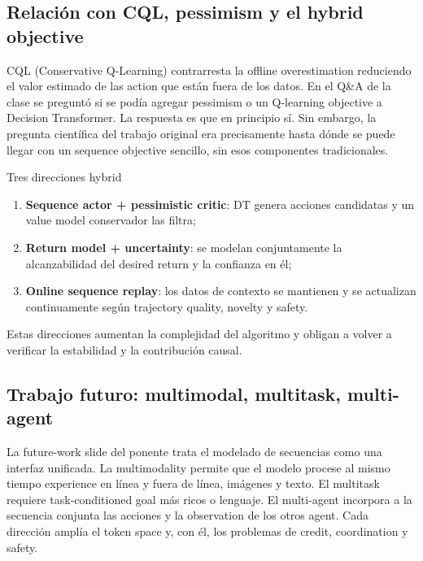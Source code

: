 \subsection{Relación con CQL, pessimism y el hybrid objective}

CQL (Conservative Q-Learning) contrarresta la offline overestimation reduciendo el valor estimado de las action que están fuera de los datos. En el Q\&A de la clase se preguntó si se podía agregar pessimism o un Q-learning objective a Decision Transformer. La respuesta es que en principio sí. Sin embargo, la pregunta científica del trabajo original era precisamente hasta dónde se puede llegar con un sequence objective sencillo, sin esos componentes tradicionales.

\begin{knowledgebox}{Tres direcciones hybrid}
\begin{enumerate}
  \item \textbf{Sequence actor + pessimistic critic}: DT genera acciones candidatas y un value model conservador las filtra;
  \item \textbf{Return model + uncertainty}: se modelan conjuntamente la alcanzabilidad del desired return y la confianza en él;
  \item \textbf{Online sequence replay}: los datos de contexto se mantienen y se actualizan continuamente según trajectory quality, novelty y safety.
\end{enumerate}
Estas direcciones aumentan la complejidad del algoritmo y obligan a volver a verificar la estabilidad y la contribución causal.
\end{knowledgebox}

\subsection{Trabajo futuro: multimodal, multitask, multi-agent}

La future-work slide del ponente trata el modelado de secuencias como una interfaz unificada. La multimodality permite que el modelo procese al mismo tiempo experience en línea y fuera de línea, imágenes y texto. El multitask requiere task-conditioned goal más ricos o lenguaje. El multi-agent incorpora a la secuencia conjunta las acciones y la observation de los otros agent. Cada dirección amplía el token space y, con él, los problemas de credit, coordination y safety.


